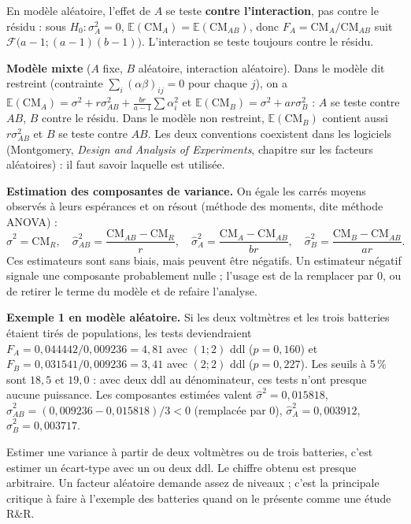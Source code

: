 \documentclass[11pt,a4paper]{article}
\theoremstyle{sj}
\theoremstyle{definition}
\theoremstyle{remark}
\newcommand{\E}{\mathbb{E}}
\newcommand{\CM}{\mathrm{CM}}
\begin{document}
\begin{essentiel}
En modèle aléatoire, l'effet de $A$ se teste \textbf{contre l'interaction}, pas contre le résidu : sous $H_0:\sigma_A^2=0$, $\E(\CM_A)=\E(\CM_{AB})$, donc $F_A=\CM_A/\CM_{AB}$ suit $\mathcal F\big(a-1;(a-1)(b-1)\big)$. L'interaction se teste toujours contre le résidu.
\end{essentiel}

\textbf{Modèle mixte} ($A$ fixe, $B$ aléatoire, interaction aléatoire). Dans le modèle dit restreint (contrainte $\sum_i(\alpha\beta)_{ij}=0$ pour chaque $j$), on a $\E(\CM_A)=\sigma^2+r\sigma_{AB}^2+\frac{br}{a-1}\sum\alpha_i^2$ et $\E(\CM_B)=\sigma^2+ar\sigma_B^2$ : $A$ se teste contre $AB$, $B$ contre le résidu. Dans le modèle non restreint, $\E(\CM_B)$ contient aussi $r\sigma_{AB}^2$ et $B$ se teste contre $AB$. Les deux conventions coexistent dans les logiciels (Montgomery, \emph{Design and Analysis of Experiments}, chapitre sur les facteurs aléatoires) : il faut savoir laquelle est utilisée.

\textbf{Estimation des composantes de variance.} On égale les carrés moyens observés à leurs espérances et on résout (méthode des moments, dite méthode ANOVA) :
\[
\hat\sigma^2=\CM_R,\quad \hat\sigma_{AB}^2=\frac{\CM_{AB}-\CM_R}{r},\quad \hat\sigma_A^2=\frac{\CM_A-\CM_{AB}}{br},\quad \hat\sigma_B^2=\frac{\CM_B-\CM_{AB}}{ar}.
\]
Ces estimateurs sont sans biais, mais peuvent être négatifs. Un estimateur négatif signale une composante probablement nulle ; l'usage est de la remplacer par $0$, ou de retirer le terme du modèle et de refaire l'analyse.

\textbf{Exemple 1 en modèle aléatoire.} Si les deux voltmètres et les trois batteries étaient tirés de populations, les tests deviendraient $F_A=0{,}044442/0{,}009236=4{,}81$ avec $(1;2)$ ddl ($p=0{,}160$) et $F_B=0{,}031541/0{,}009236=3{,}41$ avec $(2;2)$ ddl ($p=0{,}227$). Les seuils à 5\,\% sont $18{,}5$ et $19{,}0$ : avec deux ddl au dénominateur, ces tests n'ont presque aucune puissance. Les composantes estimées valent $\hat\sigma^2=0{,}015818$, $\hat\sigma_{AB}^2=(0{,}009236-0{,}015818)/3<0$ (remplacée par $0$), $\hat\sigma_A^2=0{,}003912$, $\hat\sigma_B^2=0{,}003717$.

\begin{attention}
Estimer une variance à partir de deux voltmètres ou de trois batteries, c'est estimer un écart-type avec un ou deux ddl. Le chiffre obtenu est presque arbitraire. Un facteur aléatoire demande assez de niveaux ; c'est la principale critique à faire à l'exemple des batteries quand on le présente comme une étude R\&R.
\end{attention}
\end{document}
